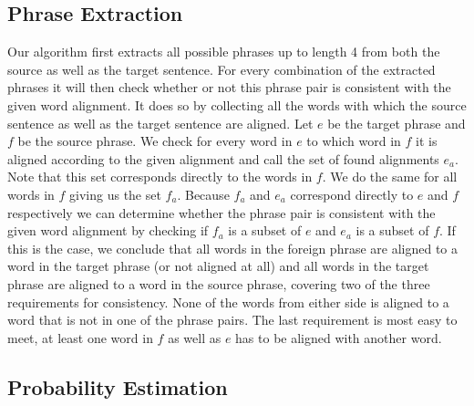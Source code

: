 \documentclass[11pt]{article}
\begin{document}
\subsection{Phrase Extraction}
\label{implem1}
Our algorithm first extracts all possible phrases up to length 4 from both the source as well as the target sentence. For every combination of the extracted phrases it will then check whether or not this phrase pair is consistent with the given word alignment. It does so by collecting all the words with which the source sentence as well as the target sentence are aligned. Let $e$ be the target phrase and $f$ be the source phrase. We check for every word in $e$ to which word in $f$ it is aligned according to the given alignment and call the set of found alignments $e_a$. Note that this set corresponds directly to the words in $f$. We do the same for all words in $f$ giving us the set $f_a$. Because $f_a$ and $e_a$ correspond directly to $e$ and $f$ respectively we can determine whether the phrase pair is consistent with the given word alignment by checking if $f_a$ is a subset of $e$ and $e_a$ is a subset of $f$. If this is the case, we conclude that all words in the foreign phrase are aligned to a word in the target phrase (or not aligned at all) and all words in the target phrase are aligned to a word in the source phrase, covering two of the three requirements for consistency. None of the words from either side is aligned to a word that is not in one of the phrase pairs. The last requirement is most easy to meet, at least one word in $f$ as well as $e$ has to be aligned with another word.

\subsection{Probability Estimation}
\label{implem3}
\end{document}
